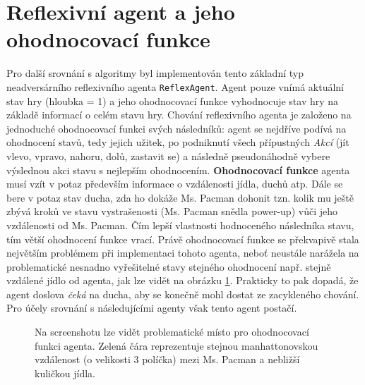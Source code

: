 \section{Reflexivní agent a jeho ohodnocovací funkce}
Pro další srovnání s algoritmy byl implementován tento základní typ neadversárního reflexivního agenta \texttt{ReflexAgent}. Agent pouze vnímá aktuální stav hry (hloubka = 1) a jeho ohodnocovací funkce vyhodnocuje stav hry na základě informací o celém stavu hry. Chování reflexivního agenta je založeno na jednoduché ohodnocovací funkci svých následníků: agent se nejdříve podívá na ohodnocení stavů, tedy jejich užitek, po podniknutí všech přípustných \textit{Akcí} (jít vlevo, vpravo, nahoru, dolů, zastavit se) a následně pseudonáhodně vybere výslednou akci stavu s nejlepším ohodnocením.
\textbf{Ohodnocovací funkce} agenta musí vzít v potaz především informace o vzdálenosti jídla, duchů atp. Dále se bere v potaz stav ducha, zda ho dokáže Ms. Pacman dohonit tzn. kolik mu ještě zbývá kroků ve stavu vystrašenosti (Ms. Pacman snědla power-up) vůči jeho vzdálenosti od Ms. Pacman. Čím lepší vlastnosti hodnoceného následníka stavu, tím větší ohodnocení funkce vrací. 
Právě ohodnocovací funkce se překvapivě stala největším problémem při implementaci tohoto agenta, neboť neustále narážela na problematické nesnadno vyřešitelné stavy stejného ohodnocení např. stejně vzdálené jídlo od agenta, jak lze vidět na obrázku \ref{img:reflexthrashV}. Prakticky to pak dopadá, že agent doslova \textit{čeká} na ducha, aby se konečně mohl dostat ze zacykleného chování. Pro účely srovnání s následujícími agenty však tento agent postačí.

\begin{figure}[!htbp]
\begin{center}
  \caption{Na screenshotu lze vidět problematické místo pro ohodnocovací funkci agenta. Zelená čára reprezentuje stejnou manhattonovskou vzdálenost (o velikosti 3 políčka) mezi Ms. Pacman a nebližší kuličkou jídla.}
  \label{img:reflexthrashV}
\end{center}
\end{figure}

